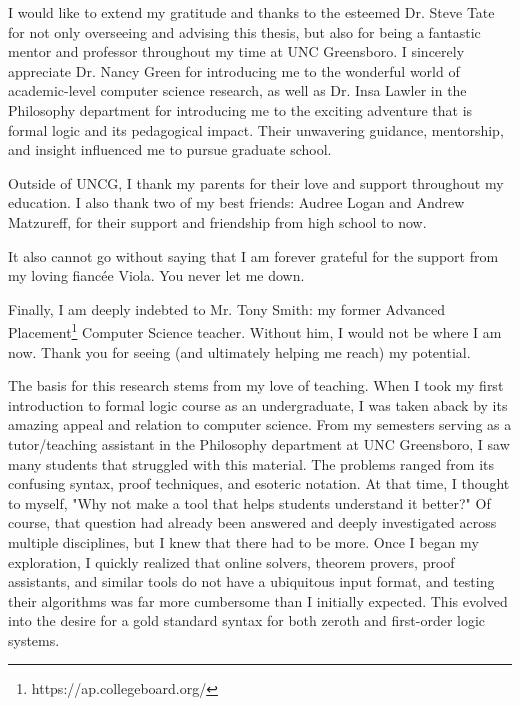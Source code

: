 \documentclass[ms]{uncgdissertationexp2}
\theoremstyle{plain}
\theoremstyle{definition}
\theoremstyle{remark}
\begin{document}
\begin{acknowledgments}
I would like to extend my gratitude and thanks to the esteemed Dr. Steve Tate for not only overseeing and advising this thesis, but also for being a fantastic mentor and professor throughout my time at UNC Greensboro. I sincerely appreciate Dr. Nancy Green for introducing me to the wonderful world of academic-level computer science research, as well as Dr. Insa Lawler in the Philosophy department for introducing me to the exciting adventure that is formal logic and its pedagogical impact. Their unwavering guidance, mentorship, and insight influenced me to pursue graduate school.

Outside of UNCG, I thank my parents for their love and support throughout my education. I also thank two of my best friends: Audree Logan and Andrew Matzureff, for their support and friendship from high school to now.

It also cannot go without saying that I am forever grateful for the support from my loving fiancée Viola. You never let me down.

Finally, I am deeply indebted to Mr. Tony Smith: my former Advanced Placement\footnote{https://ap.collegeboard.org/} Computer Science teacher. Without him, I would not be where I am now. Thank you for seeing (and ultimately helping me reach) my potential.
\end{acknowledgments}

\begin{preface}
The basis for this research stems from my love of teaching. When I took my first introduction to formal logic course as an undergraduate, I was taken aback by its amazing appeal and relation to computer science. From my semesters serving as a tutor/teaching assistant in the Philosophy department at UNC Greensboro, I saw many students that struggled with this material. The problems ranged from its confusing syntax, proof techniques, and esoteric notation. At that time, I thought to myself, "Why not make a tool that helps students understand it better?" Of course, that question had already been answered and deeply investigated across multiple disciplines, but I knew that there had to be more. Once I began my exploration, I quickly realized that online solvers, theorem provers, proof assistants, and similar tools do not have a ubiquitous input format, and testing their algorithms was far more cumbersome than I initially expected. This evolved into the desire for a gold standard syntax for both zeroth and first-order logic systems.
\end{preface}
\end{document}
